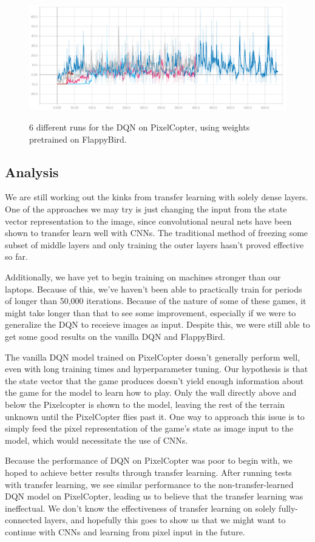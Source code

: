 \documentclass{article}
\begin{document}
\begin{figure}[h!]
\includegraphics[width=\textwidth]{pixelcopter-transfer}
\label{fig:transfer-training}
\caption{6 different runs for the DQN on PixelCopter, using weights pretrained on FlappyBird.}
\end{figure}


\subsection{Analysis}
We are still working out the kinks from transfer learning with solely dense layers. 
One of the approaches we may try is just changing the input from the state vector representation to the image, since convolutional neural nets have been shown to transfer learn well with CNNs.
The traditional method of freezing some subset of middle layers and only training the outer layers hasn't proved effective so far.

Additionally, we have yet to begin training on machines stronger than our laptops.
Because of this, we've haven't been able to practically train for periods of longer than 50,000 iterations.
Because of the nature of some of these games, it might take longer than that to see some improvement, especially if we were to generalize the DQN to receieve images as input.
Despite this, we were still able to get some good results on the vanilla DQN and FlappyBird.

The vanilla DQN model trained on PixelCopter doesn't generally perform well, even with long training times and hyperparameter tuning.
Our hypothesis is that the state vector that the game produces doesn't yield enough information about the game for the model to learn how to play. 
Only the wall directly above and below the Pixelcopter is shown to the model, leaving the rest of the terrain unknown until the PixelCopter flies past it.
One way to approach this issue is to simply feed the pixel representation of the game's state as image input to the model, which would necessitate the use of CNNs.

Because the performance of DQN on PixelCopter was poor to begin with, we hoped to achieve better results through transfer learning.
After running tests with transfer learning, we see similar performance to the non-transfer-learned DQN model on PixelCopter, leading us to believe that the transfer learning was ineffectual.
We don't know the effectiveness of transfer learning on solely fully-connected layers, and hopefully this goes to show us that we might want to continue with CNNs and learning from pixel input in the future.




\end{document}
